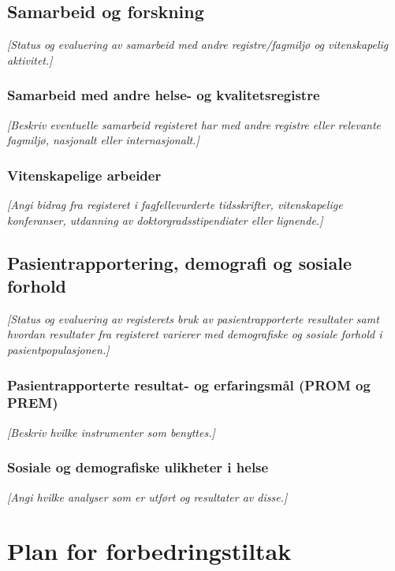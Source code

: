\documentclass[norsk, a4paper, twocolumn]{report}
\newcommand{\guide}[1] {
	\textit{[\textcolor{guidegray}{#1}]}
	}
\begin{document}
\chapter{Samarbeid og forskning}\label{cha:for}
\guide{Status og evaluering av samarbeid med andre registre/fagmiljø og  vitenskapelig aktivitet.}

\section{Samarbeid med andre helse- og kvalitetsregistre}\label{sec:samfag}
\guide{Beskriv eventuelle samarbeid registeret har med andre registre eller relevante fagmiljø, nasjonalt eller internasjonalt.}

\section{Vitenskapelige arbeider}\label{sec:vitarb}
\guide{Angi bidrag fra registeret i fagfellevurderte tidsskrifter,
vitenskapelige konferanser, utdanning av doktorgradsstipendiater eller
lignende.}



\chapter{Pasientrapportering, demografi og sosiale forhold}\label{cha:pas}
\guide{Status og evaluering av registerets bruk av pasientrapporterte
resultater samt
hvordan resultater fra registeret varierer med demografiske og sosiale forhold
i pasientpopulasjonen.}

\section{Pasientrapporterte resultat- og erfaringsmål (PROM og PREM)}\label{sec:pasutk}
\guide{Beskriv hvilke instrumenter som benyttes.}


\section{Sosiale og demografiske ulikheter i helse}\label{sec:sosdem}
\guide{Angi hvilke analyser som er utført og resultater av disse.}


\onecolumn



\part{Plan for forbedringstiltak}\label{par:for}
\end{document}
